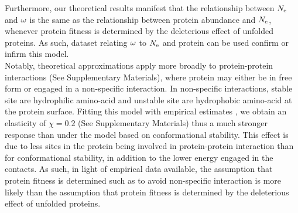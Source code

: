 \documentclass{article}
\begin{document}
Furthermore, our theoretical results manifest that the relationship between $N_{\mathrm{e}}$ and $\omega$ is the same as the relationship between protein abundance and $N_{\mathrm{e}}$, whenever protein fitness is determined by the deleterious effect of unfolded proteins.
As such, dataset relating $\omega$ to $N_{\mathrm{e}}$ and protein can be used confirm or infirm this model.\\

Notably, theoretical approximations apply more broadly to protein-protein interactions (See Supplementary Materials), where protein may either be in free form or engaged in a non-specific interaction. 
In non-specific interactions, stable site are hydrophilic amino-acid and unstable site are hydrophobic amino-acid at the protein surface.
Fitting this model with empirical estimates \cite{Zhang2008}, we obtain an elasticity of $\chi = 0.2$ (See Supplementary Materials) thus a much stronger response than under the model based on conformational stability. 
This effect is due to less sites in the protein being involved in protein-protein interaction than for conformational stability, in addition to the lower energy engaged in the contacts.
As such, in light of empirical data available, the assumption that protein fitness is determined such as to avoid non-specific interaction is more likely than the assumption that protein fitness is determined by the deleterious effect of unfolded proteins. \\

\end{document}
